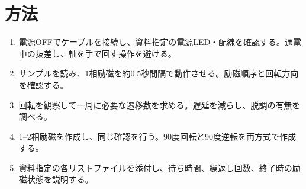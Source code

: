 \documentclass[lualatex,a4paper,10pt]{jlreq}
\begin{document}
\section{方法}\label{sec:auto4}
\begin{enumerate}
\item 電源OFFでケーブルを接続し、資料指定の電源LED・配線を確認する。通電中の抜差し、軸を手で回す操作を避ける。
\item サンプルを読み、1相励磁を約0.5秒間隔で動作させる。励磁順序と回転方向を確認する。
\item 回転を観察して一周に必要な遷移数を求める。遅延を減らし、脱調の有無を調べる。
\item 1--2相励磁を作成し、同じ確認を行う。90度回転と90度逆転を両方式で作成する。
\item 資料指定の各リストファイルを添付し、待ち時間、繰返し回数、終了時の励磁状態を説明する。
\end{enumerate}
\clearpage
\end{document}
